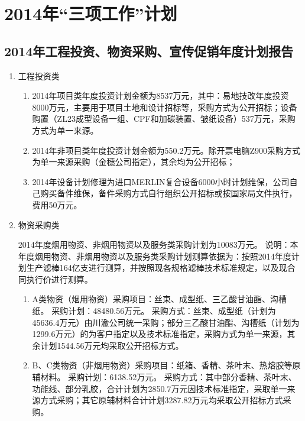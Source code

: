 ﻿\chapter{2014年“三项工作”计划}
\section{2014年工程投资、物资采购、宣传促销年度计划报告}


\renewcommand{\labelenumi}{\indent \chinese{enumi}}
\begin{enumerate}
 \setlength{\parsep}{0ex} %
 \setlength{\topsep}{1ex} %
 \setlength{\itemsep}{0.5ex} %

\item 工程投资类
  \begin{enumerate}[1、]
  \item 2014年项目类年度投资计划金额为8537万元，其中：易地技改年度投资8000万元，主要用于项目土地和设计招标等，采购方式为公开招标；设备购置（ZL23成型设备一组、CPF和加碳装置、皱纸设备）537万元，采购方式为单一来源。
  \item 2014年非项目类年度投资计划金额为550.2万元。除开票电脑Z900采购方式为单一来源采购（金穗公司指定），其余均为公开招标；
  \item 2014年设备计划修理为进口MERLIN复合设备6000小时计划维保，公司自己购买备件维保，备件采购方式自行组织公开招标或按国家局文件执行，费用50万元。
\end{enumerate}


\item 物资采购类

2014年度烟用物资、非烟用物资以及服务类采购计划为10083万元。
说明：本年度烟用物资、非烟用物资以及服务类采购计划测算依据为：按照2014年度计划生产滤棒164亿支进行测算，并按照现各规格滤棒技术标准规定，以及现合同执行价进行测算。

\begin{enumerate}[1、]
  \item A类物资（烟用物资）采购项目：丝束、成型纸、三乙酸甘油酯、沟槽纸。
采购计划：48480.56万元。
采购方式：丝束、成型纸（计划为45636.4万元）由川渝公司统一采购；部分三乙酸甘油酯、沟槽纸（计划为1299.6万元）的为客户指定以及技术标准指定，采购方式为单一来源，其余计划1544.56万元均采取公开招标方式。

  \item B、C类物资（非烟用物资）采购项目：纸箱、香精、茶叶末、热熔胶等原辅材料。
采购计划：6138.52万元。
采购方式：其中部分香精、茶叶末、功能线、部分乳胶，合计计划为2850.7万元因技术标准指定，采取单一来源方式采购；其它原辅材料合计计划3287.82万元均采取公开招标方式采购。


\end{enumerate}
\end{enumerate}
